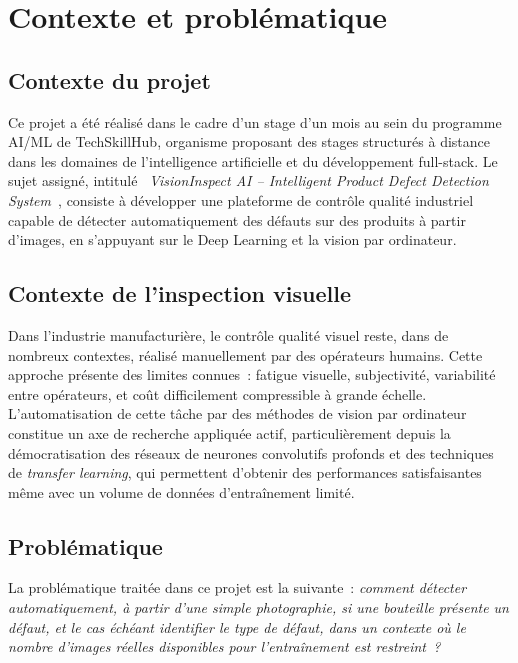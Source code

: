 \chapter{Contexte et probl\'ematique}
\label{ch:introduction}

\section{Contexte du projet}

Ce projet a \'et\'e r\'ealis\'e dans le cadre d'un stage d'un mois au sein du programme AI/ML de TechSkillHub, organisme proposant des stages structur\'es \`a distance dans les domaines de l'intelligence artificielle et du d\'eveloppement full-stack. Le sujet assign\'e, intitul\'e \emph{\guillemotleft~VisionInspect AI -- Intelligent Product Defect Detection System~\guillemotright}, consiste \`a d\'evelopper une plateforme de contr\^ole qualit\'e industriel capable de d\'etecter automatiquement des d\'efauts sur des produits \`a partir d'images, en s'appuyant sur le Deep Learning et la vision par ordinateur.

\section{Contexte de l'inspection visuelle}

Dans l'industrie manufacturi\`ere, le contr\^ole qualit\'e visuel reste, dans de nombreux contextes, r\'ealis\'e manuellement par des op\'erateurs humains. Cette approche pr\'esente des limites connues~: fatigue visuelle, subjectivit\'e, variabilit\'e entre op\'erateurs, et co\^ut difficilement compressible \`a grande \'echelle. L'automatisation de cette t\^ache par des m\'ethodes de vision par ordinateur constitue un axe de recherche appliqu\'ee actif, particuli\`erement depuis la d\'emocratisation des r\'eseaux de neurones convolutifs profonds et des techniques de \emph{transfer learning}, qui permettent d'obtenir des performances satisfaisantes m\^eme avec un volume de donn\'ees d'entra\^inement limit\'e.

\section{Probl\'ematique}

La probl\'ematique trait\'ee dans ce projet est la suivante~: \emph{comment d\'etecter automatiquement, \`a partir d'une simple photographie, si une bouteille pr\'esente un d\'efaut, et le cas \'ech\'eant identifier le type de d\'efaut, dans un contexte o\`u le nombre d'images r\'eelles disponibles pour l'entra\^inement est restreint~?}

